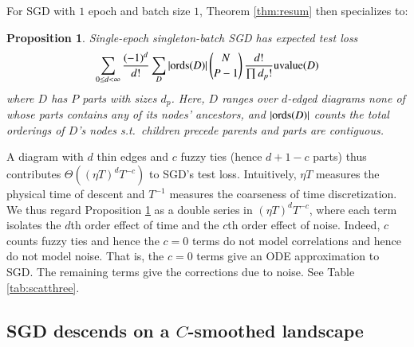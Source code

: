 \documentclass{article}
\theoremstyle{plain}
\newtheorem{prop}{Proposition}
\theoremstyle{definition}
\newcommand{\wrap}[1]{\left(#1\right)}
\newcommand{\uvalue}{\text{\textnormal{uvalue}}}
\newcommand{\ords}{\text{\textnormal{ords}}}
\begin{document}
        For SGD with $1$ epoch and batch size $1$, Theorem \ref{thm:resum} then
        specializes to: 
        \begin{prop} \label{prop:vanilla}
            Single-epoch singleton-batch SGD has expected test loss
            \begin{equation*}\label{eq:sgdbasiccoef}
                \sum_{0\leq d<\infty}
                \frac{(-1)^d}{d!} \sum_{D} 
                |\ords(D)| \, {N \choose P-1} \, \frac{d!}{\prod d_p!}
                \uvalue(D)
            \end{equation*}
            where $D$ has $P$ parts with sizes $d_p$.
            Here, $D$ ranges over $d$-edged diagrams none of whose parts
            contains any of its nodes' ancestors, and
            $|\ords(D)|$ counts the total orderings of $D$'s nodes s.t.\
            children precede parents and parts are contiguous.
        \end{prop}
        A diagram with $d$ thin edges and $c$ fuzzy ties (hence $d+1-c$
        parts) thus contributes $\Theta\wrap{(\eta T)^d T^{-c}}$ to SGD's test
        loss. 
        Intuitively, $\eta T$ measures the physical time of descent and
        $T^{-1}$ measures the coarseness of time discretization.  We thus
        regard Proposition \ref{prop:vanilla} as a double series in $(\eta T)^d
        T^{-c}$, where each term isolates the $d$th order effect of time and
        the $c$th order effect of noise.  Indeed, $c$ counts fuzzy ties and
        hence the $c=0$ terms do not model correlations and hence do not model
        noise.  That is, the $c=0$ terms give an ODE approximation to SGD.  The
        remaining terms give the corrections due to noise.  See Table
        \ref{tab:scatthree}. 


    \subsection{SGD descends on a $C$-smoothed landscape}
\end{document}
